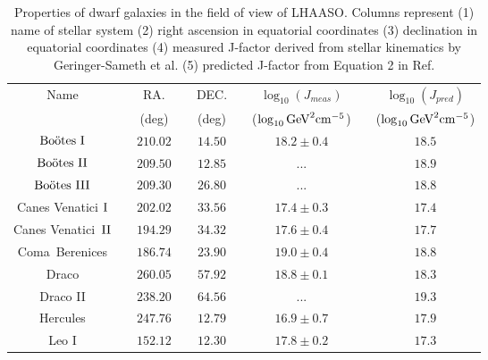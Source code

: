 \documentclass[12pt,prd,showpacs,amsmath,amssymb,aps,floats,floatfix,nofootinbib]{revtex4-1}
\def\GeV{\mathrm{GeV}} %
\begin{document}
\begin{table*}
\caption{\label{tab1}Properties of dwarf galaxies in the field of view of LHAASO. Columns represent (1) name of stellar system (2) right ascension in equatorial coordinates (3) declination in equatorial coordinates (4) measured J-factor derived from stellar kinematics by Geringer-Sameth et al. \cite{Geringer-Sameth:2014yza} (5) predicted J-factor from Equation 2 in Ref. \cite{Fermi-LAT:2016uux}}
	\begin{tabular}{ccccccccc}
		\hline \hline
 Name& & RA. && DEC.& &$\log_{10}(J_{meas})$& &$\log_{10}(J_{pred})$\\
		
         &&
		(deg)&&
		(deg)&&
		($\log_{10}\GeV^{2}\rm cm^{-5}$)&&
		($\log_{10}\GeV^{2}\rm cm^{-5}$)\\\hline


		$\rm Bo\ddot{o}tes ~I$&&
		$210.02$&&
		$14.50$&&
		$18.2\pm0.4$&&
		$18.5$\\
		
		$\rm Bo\ddot{o}tes~II$&&
		$209.50$&&
		$12.85$&&
		$...$&&
		$18.9$\\
		
		$\rm Bo\ddot{o}tes~III$&&
		$209.30$&&
		$26.80$&&
		$...$&&
		$18.8$\\
		
		Canes Venatici $\rm I$&&
		$202.02$&&
		$33.56$&&
		$17.4\pm0.3$&&
		$17.4$\\
		
		Canes Venatici~$\rm II$&&
		$194.29$&&
		$34.32$&&
		$17.6\pm0.4$&&
		$17.7$\\
		
		Coma~Berenices&&
		$186.74$&&
		$23.90$&&
		$19.0\pm0.4$&&
		$18.8$\\
		
		Draco&&
		$260.05$&&
		$57.92$&&
		$18.8\pm0.1$&&
		$18.3$\\
		
		Draco II&&
		$238.20$&&
		$64.56$&&
		$...$&&
		$19.3$\\
		
        Hercules&&
		$247.76$&&
		$12.79$&&
		$16.9\pm0.7$&&
		$17.9$\\

        Leo I&&
		$152.12$&&
		$12.30$&&
		$17.8\pm0.2$&&
		$17.3$\\


\end{tabular}
\end{table*}
\end{document}
